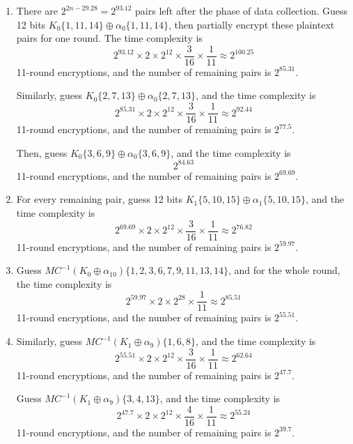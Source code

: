 \documentclass{article}
\begin{document}
\begin{enumerate}
    \item There are $2^{2n-29.28} = 2^{93.12}$ pairs left after the phase of data collection.  
    Guess 12 bits $K_0\{1, 11, 14\} \oplus \alpha_0\{1, 11, 14\}$, then partially encrypt these plaintext pairs for one round.  
    The time complexity is  
    \[
    2^{93.12} \times 2 \times 2^{12} \times \frac{3}{16} \times \frac{1}{11} \approx 2^{100.25}
    \]  
    11-round encryptions, and the number of remaining pairs is $2^{85.31}$.  

    Similarly, guess $K_0\{2, 7, 13\} \oplus \alpha_0\{2, 7, 13\}$, and the time complexity is  
    \[
    2^{85.31} \times 2 \times 2^{12} \times \frac{3}{16} \times \frac{1}{11} \approx 2^{92.44}
    \]  
    11-round encryptions, and the number of remaining pairs is $2^{77.5}$.  

    Then, guess $K_0\{3, 6, 9\} \oplus \alpha_0\{3, 6, 9\}$, and the time complexity is  
    \[
    2^{84.63}
    \]  
    11-round encryptions, and the number of remaining pairs is $2^{69.69}$.

    \item For every remaining pair, guess 12 bits $K_1\{5, 10, 15\} \oplus \alpha_1\{5, 10, 15\}$, and the time complexity is  
    \[
    2^{69.69} \times 2 \times 2^{12} \times \frac{3}{16} \times \frac{1}{11} \approx 2^{76.82}
    \]  
    11-round encryptions, and the number of remaining pairs is $2^{59.97}$.

    \item Guess $MC^{-1}(K_0 \oplus \alpha_{10})\{1, 2, 3, 6, 7, 9, 11, 13, 14\}$, and for the whole round, the time complexity is  
    \[
    2^{59.97} \times 2 \times 2^{28} \times \frac{1}{11} \approx 2^{85.51}
    \]  
    11-round encryptions, and the number of remaining pairs is $2^{55.51}$.

    \item Similarly, guess $MC^{-1}(K_1 \oplus \alpha_9)\{1, 6, 8\}$, and the time complexity is  
    \[
    2^{55.51} \times 2 \times 2^{12} \times \frac{3}{16} \times \frac{1}{11} \approx 2^{62.64}
    \]  
    11-round encryptions, and the number of remaining pairs is $2^{47.7}$.  

    Guess $MC^{-1}(K_1 \oplus \alpha_9)\{3, 4, 13\}$, and the time complexity is  
    \[
    2^{47.7} \times 2 \times 2^{12} \times \frac{4}{16} \times \frac{1}{11} \approx 2^{55.24}
    \]  
    11-round encryptions, and the number of remaining pairs is $2^{39.7}$.  


\end{enumerate}
\end{document}
